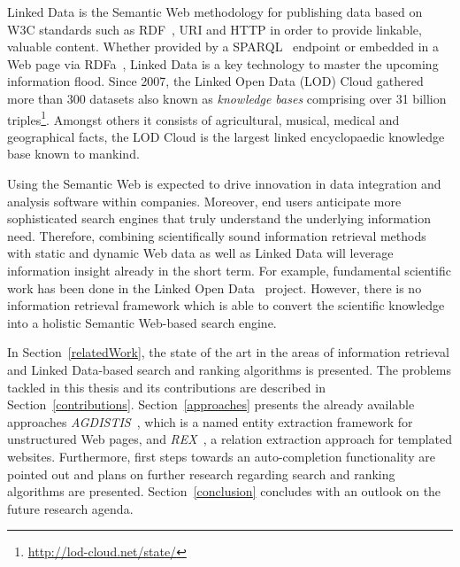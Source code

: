 Linked Data is the Semantic Web methodology for publishing data based on W3C standards such as RDF~\cite{RDF-PRIMER}, URI and HTTP in order to provide linkable, valuable content.
Whether provided by a SPARQL~\cite{SPARQL} endpoint or embedded in a Web page via RDFa~\cite{RDFA}, Linked Data is a key technology to master the upcoming information flood.
Since 2007, the Linked Open Data (LOD) Cloud gathered more than 300 datasets also known as \emph{knowledge bases} comprising over 31 billion triples\footnote{\url{http://lod-cloud.net/state/}}.
Amongst others it consists of agricultural, musical, medical and geographical facts, the LOD Cloud is the largest linked encyclopaedic knowledge base known to mankind.

Using the Semantic Web is expected to drive innovation in data integration and analysis software within companies.
Moreover, end users anticipate more sophisticated search engines that truly understand the underlying information need.
Therefore, combining scientifically sound information retrieval methods with static and dynamic Web data as well as Linked Data will leverage information insight already in the short term.
For example, fundamental scientific work has been done in the Linked Open Data~\cite{lod2} project.
However, there is no information retrieval framework which is able to convert the scientific knowledge into a holistic Semantic Web-based search engine.

In Section~\ref{relatedWork}, the state of the art in the areas of information retrieval and Linked Data-based search and ranking algorithms is presented. 
The problems tackled in this thesis and its contributions are described in Section~\ref{contributions}.
Section~\ref{approaches} presents the already available approaches \emph{AGDISTIS}~\cite{AGDISTIS}, which is a named entity extraction framework for unstructured Web pages, and \emph{REX}~\cite{REX}, a relation extraction approach for templated websites. 
Furthermore, first steps towards an auto-completion functionality are pointed out and plans on further research regarding search and ranking algorithms are presented. 
Section~\ref{conclusion} concludes with an outlook on the future research agenda.

